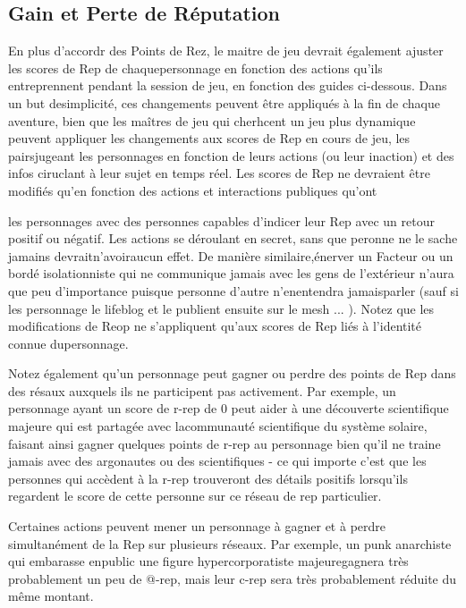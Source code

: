 {\subsection{Gain et Perte de Réputation} 

En plus d'accordr des Points de Rez, le maitre de jeu devrait également ajuster les scores de Rep de chaquepersonnage en fonction des actions qu'ils entreprennent pendant la session de jeu, en fonction des guides ci-dessous. Dans un but desimplicité, ces changements peuvent être appliqués à la fin de chaque aventure, bien que les maîtres de jeu qui cherhcent un jeu plus dynamique peuvent appliquer les changements aux scores de Rep en cours de jeu, les pairsjugeant les personnages en fonction de leurs actions (ou leur inaction) et des infos ciruclant à leur sujet en temps réel. Les scores de Rep ne devraient être modifiés qu'en fonction des actions et interactions publiques qu'ont 

les personnages avec des personnes capables d'indicer leur Rep avec un retour positif ou négatif. Les actions se déroulant en secret, sans que peronne ne le sache jamains devraitn'avoiraucun effet. De manière similaire,énerver un Facteur ou un bordé isolationniste qui ne communique jamais avec les gens de l'extérieur n'aura que peu d'importance puisque personne d'autre n'enentendra jamaisparler (sauf si les personnage le lifeblog et le publient ensuite sur le mesh ... ). Notez que les modifications de Reop ne s'appliquent qu'aux scores de Rep liés à l'identité connue dupersonnage. 

Notez également qu'un personnage peut gagner ou perdre des points de Rep dans des résaux auxquels ils ne participent pas activement. Par exemple, un personnage ayant un score de r-rep de 0 peut aider à une découverte scientifique majeure qui est partagée avec lacommunauté scientifique du système solaire, faisant ainsi gagner quelques points de r-rep au personnage bien qu'il ne traine jamais avec des argonautes ou des scientifiques - ce qui importe c'est que les personnes qui accèdent à la r-rep trouveront des détails positifs lorsqu'ils regardent le score de cette personne sur ce réseau de rep particulier. 

Certaines actions peuvent mener un personnage à gagner et à perdre simultanément de la Rep sur plusieurs réseaux. Par exemple, un punk anarchiste qui embarasse enpublic une figure hypercorporatiste majeuregagnera très probablement un peu de @-rep, mais leur c-rep sera très probablement réduite du même montant. 

}
